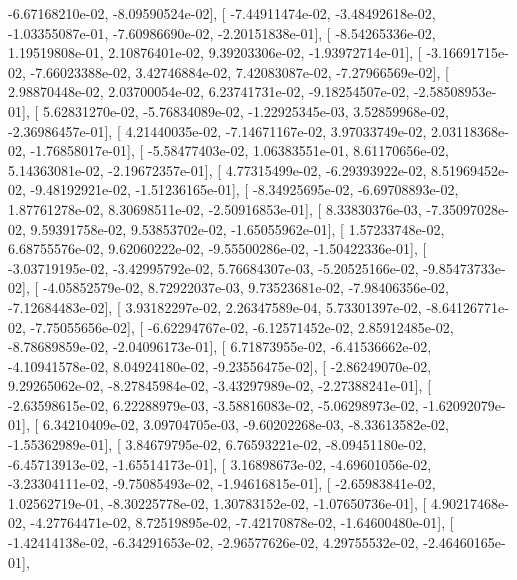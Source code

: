 \documentclass{article}
\begin{document}
         -6.67168210e-02,  -8.09590524e-02],
       [ -7.44911474e-02,  -3.48492618e-02,  -1.03355087e-01,
         -7.60986690e-02,  -2.20151838e-01],
       [ -8.54265336e-02,   1.19519808e-01,   2.10876401e-02,
          9.39203306e-02,  -1.93972714e-01],
       [ -3.16691715e-02,  -7.66023388e-02,   3.42746884e-02,
          7.42083087e-02,  -7.27966569e-02],
       [  2.98870448e-02,   2.03700054e-02,   6.23741731e-02,
         -9.18254507e-02,  -2.58508953e-01],
       [  5.62831270e-02,  -5.76834089e-02,  -1.22925345e-03,
          3.52859968e-02,  -2.36986457e-01],
       [  4.21440035e-02,  -7.14671167e-02,   3.97033749e-02,
          2.03118368e-02,  -1.76858017e-01],
       [ -5.58477403e-02,   1.06383551e-01,   8.61170656e-02,
          5.14363081e-02,  -2.19672357e-01],
       [  4.77315499e-02,  -6.29393922e-02,   8.51969452e-02,
         -9.48192921e-02,  -1.51236165e-01],
       [ -8.34925695e-02,  -6.69708893e-02,   1.87761278e-02,
          8.30698511e-02,  -2.50916853e-01],
       [  8.33830376e-03,  -7.35097028e-02,   9.59391758e-02,
          9.53853702e-02,  -1.65055962e-01],
       [  1.57233748e-02,   6.68755576e-02,   9.62060222e-02,
         -9.55500286e-02,  -1.50422336e-01],
       [ -3.03719195e-02,  -3.42995792e-02,   5.76684307e-03,
         -5.20525166e-02,  -9.85473733e-02],
       [ -4.05852579e-02,   8.72922037e-03,   9.73523681e-02,
         -7.98406356e-02,  -7.12684483e-02],
       [  3.93182297e-02,   2.26347589e-04,   5.73301397e-02,
         -8.64126771e-02,  -7.75055656e-02],
       [ -6.62294767e-02,  -6.12571452e-02,   2.85912485e-02,
         -8.78689859e-02,  -2.04096173e-01],
       [  6.71873955e-02,  -6.41536662e-02,  -4.10941578e-02,
          8.04924180e-02,  -9.23556475e-02],
       [ -2.86249070e-02,   9.29265062e-02,  -8.27845984e-02,
         -3.43297989e-02,  -2.27388241e-01],
       [ -2.63598615e-02,   6.22288979e-03,  -3.58816083e-02,
         -5.06298973e-02,  -1.62092079e-01],
       [  6.34210409e-02,   3.09704705e-03,  -9.60202268e-03,
         -8.33613582e-02,  -1.55362989e-01],
       [  3.84679795e-02,   6.76593221e-02,  -8.09451180e-02,
         -6.45713913e-02,  -1.65514173e-01],
       [  3.16898673e-02,  -4.69601056e-02,  -3.23304111e-02,
         -9.75085493e-02,  -1.94616815e-01],
       [ -2.65983841e-02,   1.02562719e-01,  -8.30225778e-02,
          1.30783152e-02,  -1.07650736e-01],
       [  4.90217468e-02,  -4.27764471e-02,   8.72519895e-02,
         -7.42170878e-02,  -1.64600480e-01],
       [ -1.42414138e-02,  -6.34291653e-02,  -2.96577626e-02,
          4.29755532e-02,  -2.46460165e-01],
\end{document}
